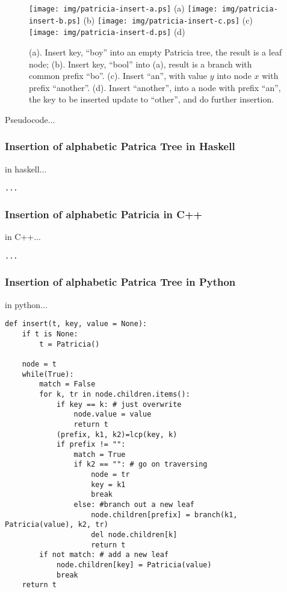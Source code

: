 \documentclass{article}
\begin{document}
\begin{figure}[htbp]
       \begin{center}
	\texttt{[image: img/patricia-insert-a.ps]} (a)
	\texttt{[image: img/patricia-insert-b.ps]} (b)
	\texttt{[image: img/patricia-insert-c.ps]} (c)
	\texttt{[image: img/patricia-insert-d.ps]} (d)
        \caption{(a). Insert key, ``boy'' into an empty Patricia tree,
	the result is a leaf node; \newline
	(b). Insert key, ``bool'' into (a), result is a branch with
	common prefix ``bo''. \newline
        (c). Insert ``an'', with value $y$ into node $x$ with prefix
	``another''. \newline
        (d). Insert ``another'', into a node with prefix ``an'', the key to be inserted update to ``other'', and do further insertion.}
        \label{fig:patricia-insert}
       \end{center}
\end{figure}

Pseudocode...

\subsubsection*{Insertion of alphabetic Patrica Tree in Haskell}
in haskell...

\lstset{language=Haskell}
\begin{lstlisting}
...
\end{lstlisting}

\subsubsection*{Insertion of alphabetic Patricia in C++}
in C++...

\lstset{language=C++}
\begin{lstlisting}
...
\end{lstlisting}


\subsubsection*{Insertion of alphabetic Patrica Tree in Python}
in python...

\lstset{language=Python}
\begin{lstlisting}
def insert(t, key, value = None):
    if t is None:
        t = Patricia()

    node = t
    while(True):
        match = False
        for k, tr in node.children.items():
            if key == k: # just overwrite
                node.value = value
                return t
            (prefix, k1, k2)=lcp(key, k)
            if prefix != "":
                match = True
                if k2 == "": # go on traversing
                    node = tr
                    key = k1
                    break
                else: #branch out a new leaf
                    node.children[prefix] = branch(k1, Patricia(value), k2, tr)
                    del node.children[k]
                    return t
        if not match: # add a new leaf
            node.children[key] = Patricia(value)
            break
    return t
\end{lstlisting}
\end{document}
